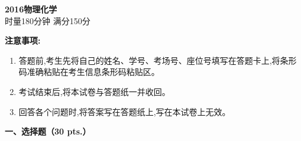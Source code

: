 \begin{center}
    {\LARGE \textbf{2016物理化学}} \\[2ex]
    {\large 时量180分钟 \quad 满分150分}
\end{center}

\vspace{0.5cm}
\noindent\textbf{注意事项:}
\begin{enumerate}[label=\arabic*., parsep=0pt, itemsep=0pt]
    \item 答题前,考生先将自己的姓名、学号、考场号、座位号填写在答题卡上,将条形码准确粘贴在考生信息条形码粘贴区。
    \item 考试结束后,将本试卷与答题纸一并收回。
    \item 回答各个问题时,将答案写在答题纸上,写在本试卷上无效。
\end{enumerate}

\vspace{0.5cm}
\noindent\textbf{一、选择题（30 pts.）}

